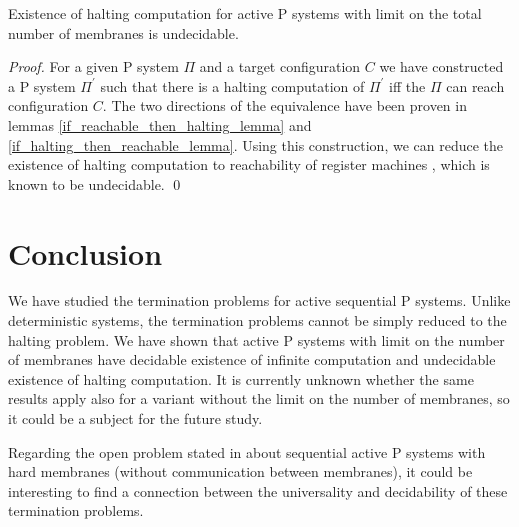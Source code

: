 \documentclass[llncs,submission,copyright,creativecommons]{../lib/lncs/llncs}
\begin{document}
\begin{theorem}
\label{existence_of_halting_theorem}
  Existence of halting computation for active P systems with limit on the total number of membranes is undecidable.
\end{theorem}

\begin{proof}
  For a given P system $\Pi$ and a target configuration $C$ we have constructed a P system $\Pi^\prime$ such that there is a halting computation of $\Pi^\prime$ iff the $\Pi$ can reach configuration $C$. The two directions of the equivalence have been proven in lemmas \ref{if_reachable_then_halting_lemma} and \ref{if_halting_then_reachable_lemma}. Using this construction, we can reduce the existence of halting computation to reachability of register machines \cite{Ibarra05Active}, which is known to be undecidable. \qed
\end{proof}



\section{Conclusion}
\label{sec:conclusion}
We have studied the termination problems for active sequential P systems. Unlike deterministic systems, the termination problems cannot be simply reduced to the halting problem. We have shown that active P systems with limit on the number of membranes have decidable existence of infinite computation and undecidable existence of halting computation. It is currently unknown whether the same results apply also for a variant without the limit on the number of membranes, so it could be a subject for the future study.

Regarding the open problem stated in \cite{Ibarra05Active} about sequential active P systems with hard membranes (without communication between membranes), it could be interesting to find a connection between the universality and decidability of these termination problems.


\end{document}

